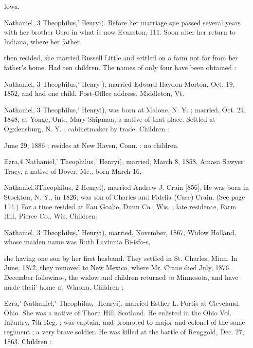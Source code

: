 \documentclass{book}
\begin{document}
Iowa. 


Nathaniel, 3 Theophilus,' Ilenryi). Before her marriage sjie 
passed several years with her brother Osro in what is now 
Evanston, 111. Soon after her return to Indiana, where her father 




then resided, she married Russell Little and settled on a farm not 
far from her father's home. Had ten children. The names of 
only four have been obtained : 





Nathaniel, 3 Theophilus,' Henry'), married Edward Haydon 
Morton, Oct. 19, 1852, and had one child. Post-Offlce address, 
Middleton, Vt. 


Nathaniel, 3 Theophilus,' Henryi), was born at Malone, N. Y. ; 
married, Oct. 24, 1848, at Yonge, Ont., Mary Shipman, a native 
of that place. Settled at Ogxlensburg, N. Y. ; cabinetmaker by 
trade. Children : 

June 29, 1886 ; resides at New Haven, Conn. ; no children. 

Ezra,4 Nathaniel,' Theophilus,' Henryi), married, March 8, 1858, 
Amasa Sawyer Tracy, a native of Dover, Me., born March 16, 








Nathaniel,3Theophilus, 2 Henryi), married Andrew J. Crain [856]. 
He was born in Stockton, N. Y., in 1826; was son of Charles 
and Fidelia (Case) Crain. (See page 114.) For a time resided 
at Eau Goalie, Dunn Co., Wis. ; late residence, Farm Hill, Pierce 
Co., Wis. Children: 





Nathaniel, 3 Theophilus,' Henryi), married, November, 1867, 
Widow Holland, whose maiden name was Ruth Lavinnia Bi-isfo-s, 




she having one son by her first husband. They settled in St. 
Charles, Minn. In June, 1872, they removed to New Mexico, 
where Mr. Crane died July, 1876. December followino-, the 
widow and children returned to Minnesota, and have made thcii' 
home at Winona. Children : 





Ezra,' Nathaniel,' Theophilus,- Henryi), married Esther L. 
Portis at Cleveland, Ohio. She was a native of Thorn Hill, 
Scotland. He enlisted in the Ohio Vol. Infantry, 7th Reg. ; was 
captain, and promoted to major and colonel of the same regiment ; 
a very brave soldier. He was killed at the battle of Renggold, 
Dec. 27, 1863. Children : 
\end{document}
